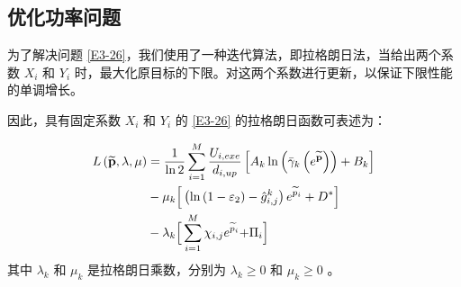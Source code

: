 \subsection{优化功率问题}\label{section3-3-3}
为了解决问题 \eqref{E3-26}，我们使用了一种迭代算法，即拉格朗日法，当给出两个系数 $X_i$ 和 $Y_i$ 时，最大化原目标的下限。对这两个系数进行更新，以保证下限性能的单调增长。

因此，具有固定系数 $X_i$ 和 $Y_i$ 的 \eqref{E3-26} 的拉格朗日函数可表述为：

\begin{align}\label{E27}
L\left(\widetilde{\mathbf{p}},\lambda,\mu\right)&=\frac{1}{\ln{2}}\sum_{i=1}^{M}{\frac{U_{i,exe}}{d_{i,up}}\left[A_k\ln{\left({\bar{\gamma}}_k\left(e^{\widetilde{\mathbf{p}}}\right)\right)}+B_k\right]}\\
&\notag-\mu_k\Big[\left(\ln\left(1-\varepsilon_2\right)-{\hat{g}}_{i,j}^k\right)e^{{\widetilde{p}}_i}+D^\ast\Big]\\
&-\lambda_k\Big[\sum_{i=1}^{M}{\chi_{i,j}e^{{\widetilde{p}}_i}}{+\mathrm{\Pi}}_i\Big]\notag
\end{align}
其中 $\lambda_k$ 和 $\mu_k$ 是拉格朗日乘数，分别为 $\lambda_k\geq0$ 和 $\mu_k\geq0$ 。

